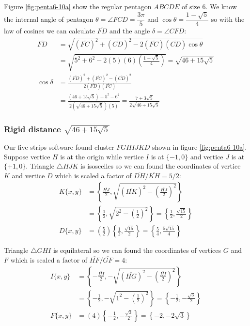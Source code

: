 \documentclass[11pt]{article}
\begin{document}
Figure \ref{fig:penta6-10a} show the regular pentagon $ABCDE$ of size $6$. We know the internal angle of pentagon $\theta=\angle{FCD} =\dfrac{3\pi}5$ and $\cos\theta=\dfrac{1-\sqrt5}4$ so with the law of cosines we can calculate $\overline{FD}$ and the angle $\delta = \angle{CFD}$:
\begin{align}
\overline{FD} &= \sqrt{(\overline{FC})^2 + (\overline{CD})^2
 - 2(\overline{FC})(\overline{CD})\cos\theta} \nonumber\\
 &= \sqrt{5^2 + 6^2 - 2(5)(6)\left(\frac{1-\sqrt5}4\right)} = \sqrt{46 + 15\sqrt5}\\
%
\cos\delta &= \frac{(\overline{FD})^2 + (\overline{FC})^2 - (\overline{CD})^2}
 {2(\overline{FD})(\overline{FC})} \nonumber\\
 &= \frac{\left(46 + 15\sqrt5\right) + 5^2 - 6^2}
  {2\left(\sqrt{46 + 15\sqrt5}\right)(5)}
  = \frac{7 + 3\sqrt5}{2\sqrt{46 + 15\sqrt5}}
\end{align}

\subsubsection{Rigid distance $\sqrt{46 + 15\sqrt5}$}

Our five-strips software found cluster $FGHIJKD$ shown in figure \ref{fig:penta6-10a}. Suppose vertice $H$ is at the origin while vertice $I$ is at $\{-1,0\}$ and vertice $J$ is at $\{+1,0\}$. Triangle $\triangle{HJK}$ is isoscelles so we can found the coordinates of vertice $K$ and vertice $D$ which is scaled a factor of $\overline{DH} / \overline{KH} = 5 / 2$:
\begin{align}
K\{x,y\} &= \left\{\frac{\overline{HJ}}2, 
 \sqrt{(\overline{HK})^2 - \left(\frac{\overline{HJ}}2\right)^2}\right\} \nonumber\\
 &= \left\{\frac{1}2, \sqrt{2^2 - \left(\frac{1}2\right)^2}\right\} 
 = \left\{\frac{1}2,\frac{\sqrt{15}}2\right\} \\
%
D\{x,y\} &= \left(\frac{5}2\right)\left\{\frac{1}2,\frac{\sqrt{15}}2\right\}
 = \left\{ \frac{5}4 , \frac{5\sqrt{15}}4 \right\}
\end{align}

Triangle $\triangle{GHI}$ is equilateral so we can found the coordinates of vertices $G$ and $F$ which is scaled a factor of $\overline{HF} / \overline{GF} = 4$:
\begin{align}
I\{x,y\} &= \left\{ -\frac{\overline{HI}}2, 
 - \sqrt{(\overline{HG})^2 - \left( \frac{\overline{HI}}2 \right)^2}\right\} \nonumber\\
 &= \left\{ -\frac{1}2, -\sqrt{1^2 - \left(\frac{1}2\right)^2} \right\}
 = \left\{ -\frac{1}2, -\frac{\sqrt3}2 \right\} \\
%
F\{x,y\} &= \left(4\right)\left\{ -\frac{1}2, -\frac{\sqrt3}2 \right\}
 = \left\{ -2, -2\sqrt{3} \right\}
\end{align}
\end{document}
